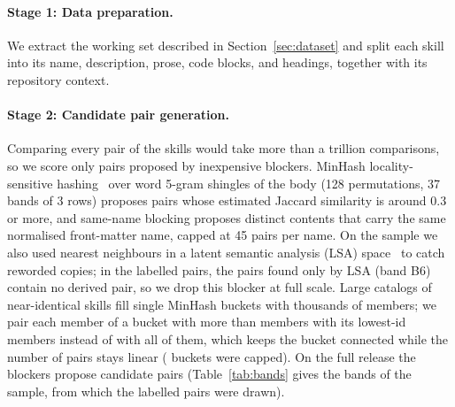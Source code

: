 \documentclass[sigconf,screen]{acmart}
\begin{document}
\paragraph{Stage 1: Data preparation.} We extract the working set described in Section~\ref{sec:dataset} and split each skill into its name, description, prose, code blocks, and headings, together with its repository context.

\paragraph{Stage 2: Candidate pair generation.} Comparing every pair of the \ResFullWorkContents{} skills would take more than a trillion comparisons, so we score only pairs proposed by inexpensive blockers. MinHash locality-sensitive hashing~\cite{broder1997resemblance} over word 5-gram shingles of the body (128 permutations, 37 bands of 3 rows) proposes pairs whose estimated Jaccard similarity is around 0.3 or more, and same-name blocking proposes distinct contents that carry the same normalised front-matter name, capped at 45 pairs per name. On the sample we also used nearest neighbours in a latent semantic analysis (LSA) space~\cite{deerwester1990lsa} to catch reworded copies; in the labelled pairs, the pairs found only by LSA (band B6) contain no derived pair, so we drop this blocker at full scale. Large catalogs of near-identical skills fill single MinHash buckets with thousands of members; we pair each member of a bucket with more than \ResFullMaxBucket{} members with its \ResFullAnchors{} lowest-id members instead of with all of them, which keeps the bucket connected while the number of pairs stays linear (\ResFullBigBuckets{} buckets were capped). On the full release the blockers propose \ResFullCandTotal{} candidate pairs (Table~\ref{tab:bands} gives the bands of the sample, from which the labelled pairs were drawn).
\end{document}
